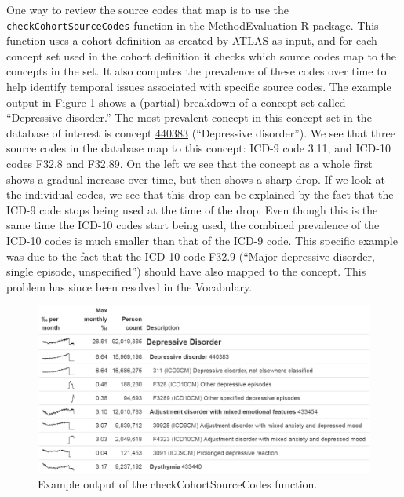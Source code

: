 \documentclass[11pt]{book}
\theoremstyle{definition}
\theoremstyle{definition}
\theoremstyle{definition}
\theoremstyle{remark}
\begin{document}
One way to review the source codes that map is to use the
\texttt{checkCohortSourceCodes} function in the
\href{https://ohdsi.github.io/MethodEvaluation/}{MethodEvaluation} R
package. This function uses a cohort definition as created by ATLAS as
input, and for each concept set used in the cohort definition it checks
which source codes map to the concepts in the set. It also computes the
prevalence of these codes over time to help identify temporal issues
associated with specific source codes. The example output in Figure
\ref{fig:sourceCodes} shows a (partial) breakdown of a concept set
called ``Depressive disorder.'' The most prevalent concept in this
concept set in the database of interest is concept
\href{http://athena.ohdsi.org/search-terms/terms/440383}{440383}
(``Depressive disorder''). We see that three source codes in the
database map to this concept: ICD-9 code 3.11, and ICD-10 codes F32.8
and F32.89. On the left we see that the concept as a whole first shows a
gradual increase over time, but then shows a sharp drop. If we look at
the individual codes, we see that this drop can be explained by the fact
that the ICD-9 code stops being used at the time of the drop. Even
though this is the same time the ICD-10 codes start being used, the
combined prevalence of the ICD-10 codes is much smaller than that of the
ICD-9 code. This specific example was due to the fact that the ICD-10
code F32.9 (``Major depressive disorder, single episode, unspecified'')
should have also mapped to the concept. This problem has since been
resolved in the Vocabulary.

\begin{figure}

{\centering \includegraphics[width=1\linewidth]{images/DataQuality/sourceCodes} 

}

\caption{Example output of the checkCohortSourceCodes function. }\label{fig:sourceCodes}
\end{figure}
\end{document}

